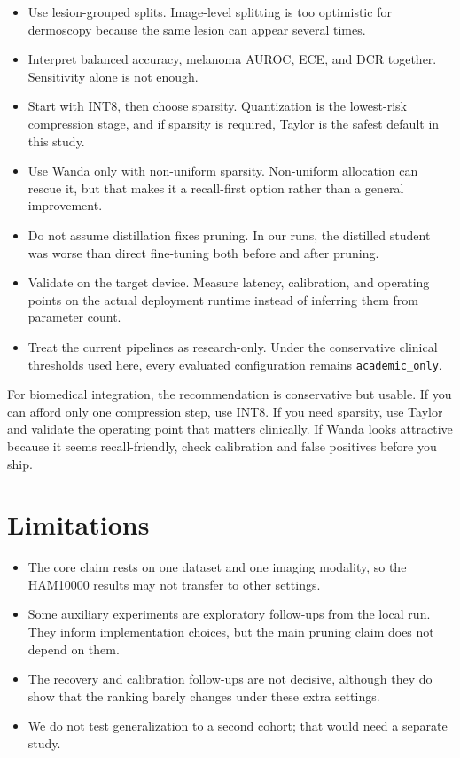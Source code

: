 \documentclass{article}
\newcommand{\DCR}{\ensuremath{\mathrm{DCR}}}
\begin{document}
\begin{itemize}[leftmargin=*,itemsep=2pt,topsep=2pt]
  \item Use lesion-grouped splits. Image-level splitting is too optimistic for dermoscopy because the same lesion can appear several times.
  \item Interpret balanced accuracy, melanoma AUROC, ECE, and \DCR{} together. Sensitivity alone is not enough.
  \item Start with INT8, then choose sparsity. Quantization is the lowest-risk compression stage, and if sparsity is required, Taylor is the safest default in this study.
  \item Use Wanda only with non-uniform sparsity. Non-uniform allocation can rescue it, but that makes it a recall-first option rather than a general improvement.
  \item Do not assume distillation fixes pruning. In our runs, the distilled student was worse than direct fine-tuning both before and after pruning.
  \item Validate on the target device. Measure latency, calibration, and operating points on the actual deployment runtime instead of inferring them from parameter count.
  \item Treat the current pipelines as research-only. Under the conservative clinical thresholds used here, every evaluated configuration remains \texttt{academic\_only}.
\end{itemize}

For biomedical integration, the recommendation is conservative but usable. If you can afford only one compression step, use INT8. If you need sparsity, use Taylor and validate the operating point that matters clinically. If Wanda looks attractive because it seems recall-friendly, check calibration and false positives before you ship.

\section{Limitations}
\begin{itemize}[leftmargin=*,itemsep=2pt,topsep=2pt]
  \item The core claim rests on one dataset and one imaging modality, so the HAM10000 results may not transfer to other settings.
  \item Some auxiliary experiments are exploratory follow-ups from the local run. They inform implementation choices, but the main pruning claim does not depend on them.
  \item The recovery and calibration follow-ups are not decisive, although they do show that the ranking barely changes under these extra settings.
  \item We do not test generalization to a second cohort; that would need a separate study.
\end{itemize}
\end{document}
